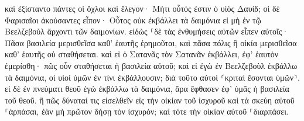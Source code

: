 \documentclass{openreader}
\begin{document}
καὶ ἐξίσταντο πάντες οἱ ὄχλοι καὶ ἔλεγον· Μήτι οὗτός ἐστιν ὁ υἱὸς Δαυίδ; 
οἱ δὲ Φαρισαῖοι ἀκούσαντες εἶπον· Οὗτος οὐκ ἐκβάλλει τὰ δαιμόνια εἰ μὴ ἐν τῷ Βεελζεβοὺλ ἄρχοντι τῶν δαιμονίων. 
εἰδὼς ⸀δὲ τὰς ἐνθυμήσεις αὐτῶν εἶπεν αὐτοῖς· Πᾶσα βασιλεία μερισθεῖσα καθ’ ἑαυτῆς ἐρημοῦται, καὶ πᾶσα πόλις ἢ οἰκία μερισθεῖσα καθ’ ἑαυτῆς οὐ σταθήσεται. 
καὶ εἰ ὁ Σατανᾶς τὸν Σατανᾶν ἐκβάλλει, ἐφ’ ἑαυτὸν ἐμερίσθη· πῶς οὖν σταθήσεται ἡ βασιλεία αὐτοῦ; 
καὶ εἰ ἐγὼ ἐν Βεελζεβοὺλ ἐκβάλλω τὰ δαιμόνια, οἱ υἱοὶ ὑμῶν ἐν τίνι ἐκβάλλουσιν; διὰ τοῦτο αὐτοὶ ⸂κριταὶ ἔσονται ὑμῶν⸃. 
εἰ δὲ ἐν πνεύματι θεοῦ ἐγὼ ἐκβάλλω τὰ δαιμόνια, ἄρα ἔφθασεν ἐφ’ ὑμᾶς ἡ βασιλεία τοῦ θεοῦ. 
ἢ πῶς δύναταί τις εἰσελθεῖν εἰς τὴν οἰκίαν τοῦ ἰσχυροῦ καὶ τὰ σκεύη αὐτοῦ ⸀ἁρπάσαι, ἐὰν μὴ πρῶτον δήσῃ τὸν ἰσχυρόν; καὶ τότε τὴν οἰκίαν αὐτοῦ ⸀διαρπάσει. 
\end{document}

